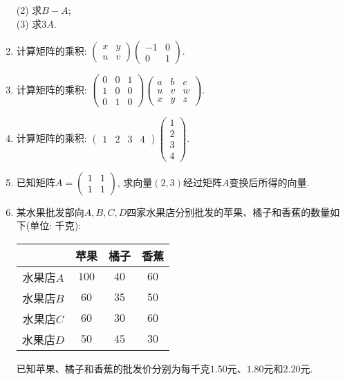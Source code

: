 \documentclass[10pt,a4paper]{article}
\begin{document}
\begin{enumerate}[1.]
(2) 求$B-A$;\\
(3) 求$3A$.
\item 计算矩阵的乘积: $\begin{pmatrix}   x & y  \\u & v  \end{pmatrix}\begin{pmatrix}    -1 & 0  \\0 & 1  \end{pmatrix}$. 
\item 计算矩阵的乘积: $\begin{pmatrix}    0 & 0 & 1  \\1 & 0 & 0  \\0 & 1 & 0  \end{pmatrix}\begin{pmatrix}  a & b & c  \\ u & v & w  \\ x & y & z  \end{pmatrix}$.
\item 计算矩阵的乘积: $\begin{pmatrix}
 1 & 2 & 3 & 4  \end{pmatrix}\begin{pmatrix}
1  \\2  \\3  \\4  \end{pmatrix}$.
\item 已知矩阵$A=\begin{pmatrix}    1 & 1  \\1 & 1  \end{pmatrix}$, 求向量$(2,3)$经过矩阵$A$变换后所得的向量.
\item 某水果批发部向$A,B,C,D$四家水果店分别批发的苹果、橘子和香蕉的数量如下(单位: 千克):
\begin{center}
    \begin{tabular}{|c|c|c|c|}
        \hline
         & 苹果	 & 橘子	 & 香蕉 \\ \hline
        水果店$A$ &	$100$ & $40$ & $60$ \\ \hline
        水果店$B$ &	$60$ & $35$ & $50$ \\ \hline
        水果店$C$ &	$60$ & $30$ & $60$ \\ \hline
        水果店$D$ & $50$ & $45$ & $30$ \\ \hline
    \end{tabular}
\end{center}
已知苹果、橘子和香蕉的批发价分别为每千克$1.50$元、$1.80$元和$2.20$元.\\

\end{enumerate}
\end{document}
